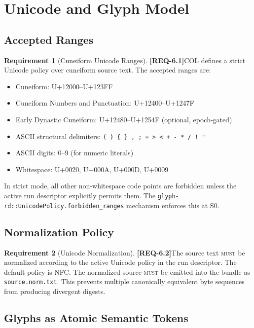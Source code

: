 \documentclass[11pt,a4paper,twoside]{article}
\theoremstyle{definition}
\newtheorem{requirement}{Requirement}[section]
\theoremstyle{remark}
\newcommand{\req}[1]{\textbf{\textcolor{reqred}{[REQ-#1]}}}
\newcommand{\must}{\textsc{must}}
\begin{document}

\section{Unicode and Glyph Model}
\label{sec:unicode}

\subsection{Accepted Ranges}

\begin{requirement}[Cuneiform Unicode Ranges]
\label{req:unicode-ranges}
\req{6.1}\quad COL defines a strict Unicode policy over cuneiform source text. The accepted ranges are:
\begin{itemize}[nosep]
  \item Cuneiform: U+12000--U+123FF
  \item Cuneiform Numbers and Punctuation: U+12400--U+1247F
  \item Early Dynastic Cuneiform: U+12480--U+1254F (optional, epoch-gated)
  \item ASCII structural delimiters: \texttt{( ) \{ \} , ; = > < + - * / ! "}
  \item ASCII digits: 0--9 (for numeric literals)
  \item Whitespace: U+0020, U+000A, U+000D, U+0009
\end{itemize}
In strict mode, all other non-whitespace code points are forbidden unless the active run descriptor explicitly permits them. The \texttt{glyph-rd::UnicodePolicy.forbidden\_ranges} mechanism enforces this at S0.
\end{requirement}

\subsection{Normalization Policy}

\begin{requirement}[Unicode Normalization]
\label{req:unicode-norm}
\req{6.2}\quad The source text \must{} be normalized according to the active Unicode policy in the run descriptor. The default policy is NFC. The normalized source \must{} be emitted into the bundle as \texttt{source.norm.txt}. This prevents multiple canonically equivalent byte sequences from producing divergent digests.
\end{requirement}

\subsection{Glyphs as Atomic Semantic Tokens}
\end{document}
